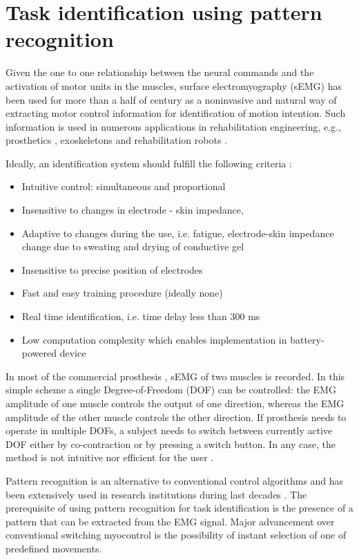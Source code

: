 \section{Task identification using pattern recognition}

Given the one to one relationship between the neural commands and the activation of motor units in the muscles, surface electromyography (sEMG) has been used for more than a half of century as a noninvasive and natural way of extracting motor control information for identification of motion intention. Such information is used in numerous applications in rehabilitation engineering, e.g., prosthetics \citep{Li2010, Young2013, Stango2015}, exoskeletons \citep{VacaBenitez2013} and rehabilitation robots \citep{Dipietro2005, Marchal-Crespo2009}.

Ideally, an identification system should fulfill the following criteria \citep{Farina2014}:
\begin{itemize}
\item Intuitive control: simultaneous and proportional
\item Insensitive to changes in electrode - skin impedance,
\item Adaptive to changes during the use, i.e. fatigue, electrode-skin impedance change due to sweating and drying of conductive gel
\item Insensitive to precise position of electrodes
\item Fast and easy training procedure (ideally none)
\item Real time identification, i.e. time delay less than 300 ms \citep{Oskoei2007}
\item Low computation complexity which enables implementation in battery-powered device
\end{itemize}

In most of the commercial prosthesis \citep{Parker1986}, sEMG of two muscles is recorded. In this simple scheme a single Degree-of-Freedom (DOF) can be controlled: the EMG amplitude of one muscle controls the output of one direction, whereas the EMG amplitude of the other muscle controls the other direction. If prosthesis needs to operate in multiple DOFs, a subject needs to switch between currently active DOF either by co-contraction or by pressing a switch button. In any case, the method is not intuitive nor efficient for the user \citep{Farina2014}.

Pattern recognition is an alternative to conventional control algorithms and has been extensively used in research institutions during last decades \citep{Hakonen2015, Farina2014}. The prerequisite of using pattern recognition for task identification is the presence of a pattern that can be extracted from the EMG signal. Major advancement over conventional switching myocontrol is the possibility of instant selection of one of predefined movements.

